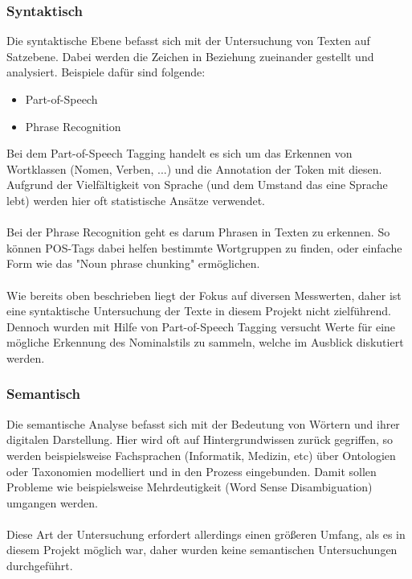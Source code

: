 \subsubsection{Syntaktisch}
Die syntaktische Ebene befasst sich mit der Untersuchung von Texten auf Satzebene. Dabei werden die Zeichen in Beziehung zueinander gestellt und analysiert. Beispiele daf\"ur sind folgende:

\begin{itemize}
\item Part-of-Speech
\item Phrase Recognition
\end{itemize}

Bei dem Part-of-Speech Tagging handelt es sich um das Erkennen von Wortklassen (Nomen, Verben, ...) und die Annotation der Token mit diesen. Aufgrund der Vielf\"altigkeit von Sprache (und dem Umstand das eine Sprache lebt) werden hier oft statistische Ans\"atze verwendet.\\ 
\\
Bei der Phrase Recognition geht es darum Phrasen in Texten zu erkennen. So k\"onnen POS-Tags dabei helfen bestimmte Wortgruppen zu finden, oder einfache Form wie das "Noun phrase chunking" erm\"oglichen.\\
\\
Wie bereits oben beschrieben liegt der Fokus auf diversen Messwerten, daher ist eine syntaktische Untersuchung der Texte in diesem Projekt nicht zielf\"uhrend. Dennoch wurden mit Hilfe von Part-of-Speech Tagging versucht Werte für eine m\"ogliche Erkennung des Nominalstils zu sammeln, welche im Ausblick diskutiert werden.

\subsubsection{Semantisch}
Die semantische Analyse befasst sich mit der Bedeutung von W\"ortern und ihrer digitalen Darstellung. Hier wird oft auf Hintergrundwissen zur\"uck gegriffen, so werden beispielsweise Fachsprachen (Informatik, Medizin, etc) \"uber Ontologien oder Taxonomien modelliert und in den Prozess eingebunden. Damit sollen Probleme wie beispielsweise Mehrdeutigkeit (Word Sense Disambiguation) umgangen werden. \\
\\
Diese Art der Untersuchung erfordert allerdings einen gr\"oßeren Umfang, als es in diesem Projekt m\"oglich war, daher wurden keine semantischen Untersuchungen durchgef\"uhrt.

